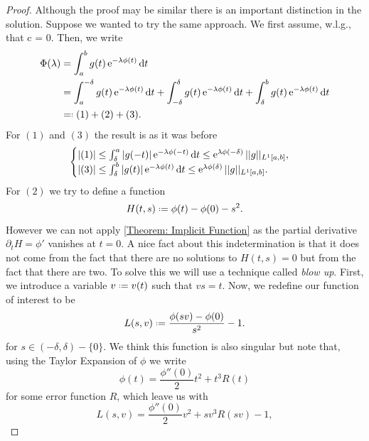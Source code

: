 \begin{proof}
	Although the proof may be similar there is an important distinction in the solution. Suppose we wanted to try the same approach. We first assume, w.l.g., that c = 0. Then, we write
	\begin{align}
	\Phi(\lambda) & = \int_{a}^{b} g(t) \ee^{-\lambda \phi(t)} \dd t \\ 
	& = \int_{a}^{-\delta} g(t) \ee^{-\lambda \phi(t)} \dd t + \int_{-\delta}^{\delta} g(t) \ee^{-\lambda \phi(t)} \dd t + \int_{\delta}^{b} g(t) \ee^{-\lambda \phi(t)} \dd t\\
	&  \revdeff (1) + (2) + (3).		
	\end{align}
	For $(1)$ and $(3)$ the result is as it was before
	\begin{equation}
		\begin{cases}
			|(1)| \leq \int_{\delta}^{a} |g(-t)| \ee^{-\lambda \phi(-t)} \dd t \leq \ee^{\lambda \phi(-\delta)} \normL{1}{g}{[a,b]},\\
			|(3)| \leq \int_{\delta}^{b} |g(t)| \ee^{-\lambda \phi(t)} \dd t \leq \ee^{\lambda \phi(\delta)} \normL{1}{g}{[a,b]}.
		\end{cases}
	\end{equation}
	For $(2)$ we try to define a function
	\begin{equation}
		H(t,s) \deff \phi(t) - \phi(0) - s^2.		
	\end{equation} 
	However we can not apply \autoref{Theorem: Implicit Function} as the partial derivative $\partial_t H = \phi'$ vanishes at $t=0$. A nice fact about this indetermination is that it does not come from the fact that there are no solutions to $H(t,s) = 0$ but from the fact that there are two. To solve this we will use a technique called \textit{blow up}. First, we introduce a variable $v \deff v(t)$ such that $vs = t$. Now, we redefine our function of interest to be
	\begin{equation}
		L(s, v) \deff \frac{\phi(sv) - \phi(0)}{s^2} - 1.		
	\end{equation}
	for $s\in(-\delta, \delta) - \{0\}$. We think this function is also singular but note that, using the Taylor Expansion of $\phi$ we write
	\begin{equation}
		\phi(t) = \frac{\phi''(0)}{2}t^2 + t^3R(t)
	\end{equation}	
	for some error function $R$, which leave us with 
	\begin{equation}
		L(s, v) = \frac{\phi''(0)}{2}v^2 + sv^3R(sv) - 1,
	\end{equation}

\end{proof}
